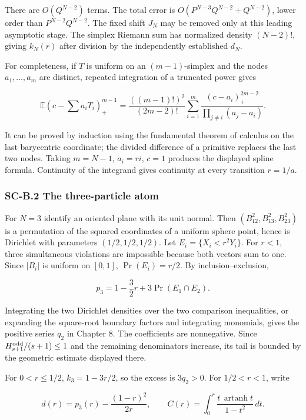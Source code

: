 There are \(O(Q^{N-2})\) terms. The total error is \(O(P^{N-3}Q^{N-2}+Q^{N-2})\), lower order than \(P^{N-2}Q^{N-2}\). The fixed shift \(J_N\) may be removed only at this leading asymptotic stage. The simplex Riemann sum has normalized density \((N-2)!\), giving \(k_N(r)\) after division by the independently established \(d_N\).

For completeness, if \(T\) is uniform on an \((m-1)\)-simplex and the nodes \(a_1,\ldots,a_m\) are distinct, repeated integration of a truncated power gives

\[
\mathbb E(c-\textstyle\sum a_iT_i)_+^{m-1}
=\frac{((m-1)!)^2}{(2m-2)!}
\sum_{i=1}^{m}\frac{(c-a_i)_+^{2m-2}}{\prod_{j\ne i}(a_j-a_i)}.
\]

It can be proved by induction using the fundamental theorem of calculus on the last barycentric coordinate; the divided difference of a primitive replaces the last two nodes. Taking \(m=N-1\), \(a_i=ri\), \(c=1\) produces the displayed spline formula. Continuity of the integrand gives continuity at every transition \(r=1/a\).

\hypertarget{sc-b.2-the-three-particle-atom}{%
\subsubsection{SC-B.2 The three-particle atom}\label{sc-b.2-the-three-particle-atom}}

For \(N=3\) identify an oriented plane with its unit normal. Then \((B_{12}^2,B_{13}^2,B_{23}^2)\) is a permutation of the squared coordinates of a uniform sphere point, hence is Dirichlet with parameters \((1/2,1/2,1/2)\). Let \(E_i=\{X_i<r^2Y_i\}\). For \(r<1\), three simultaneous violations are impossible because both vectors sum to one. Since \(|B_i|\) is uniform on \([0,1]\), \(\Pr(E_i)=r/2\). By inclusion--exclusion,

\[
p_3=1-\frac32r+3\Pr(E_1\cap E_2).
\]

Integrating the two Dirichlet densities over the two comparison inequalities, or expanding the square-root boundary factors and integrating monomials, gives the positive series \(q_2\) in Chapter 8. The coefficients are nonnegative. Since \(H_{s+1}^{\rm odd}/(s+1)\leq1\) and the remaining denominators increase, its tail is bounded by the geometric estimate displayed there.

For \(0<r\leq1/2\), \(k_3=1-3r/2\), so the excess is \(3q_2>0\). For \(1/2<r<1\), write

\[
d(r)=p_3(r)-\frac{(1-r)^2}{2r},\qquad
C(r)=\int_0^r\frac{t\,\operatorname{artanh}t}{1-t^2}\,dt.
\]

